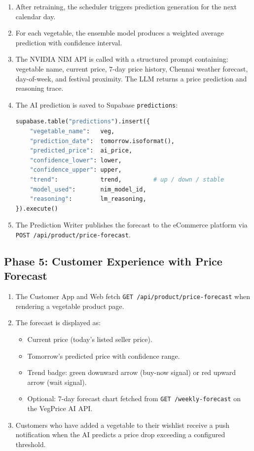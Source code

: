 \documentclass[12pt, a4paper, oneside]{report}
\begin{document}
\begin{enumerate}
  \item After retraining, the scheduler triggers prediction generation for the
        next calendar day.
  \item For each vegetable, the ensemble model produces a weighted average
        prediction with confidence interval.
  \item The NVIDIA NIM API is called with a structured prompt containing:
        vegetable name, current price, 7-day price history, Chennai weather
        forecast, day-of-week, and festival proximity. The LLM returns a
        price prediction and reasoning trace.
  \item The AI prediction is saved to Supabase \texttt{predictions}:
    \begin{lstlisting}[language=Python, numbers=none]
supabase.table("predictions").insert({
    "vegetable_name":   veg,
    "prediction_date":  tomorrow.isoformat(),
    "predicted_price":  ai_price,
    "confidence_lower": lower,
    "confidence_upper": upper,
    "trend":            trend,         # up / down / stable
    "model_used":       nim_model_id,
    "reasoning":        lm_reasoning,
}).execute()
    \end{lstlisting}
  \item The Prediction Writer publishes the forecast to the eCommerce platform
        via \texttt{POST /api/product/price-forecast}.
\end{enumerate}

\subsection{Phase 5: Customer Experience with Price Forecast}

\begin{enumerate}
  \item The Customer App and Web fetch \texttt{GET /api/product/price-forecast}
        when rendering a vegetable product page.
  \item The forecast is displayed as:
    \begin{itemize}
      \item Current price (today's listed seller price).
      \item Tomorrow's predicted price with confidence range.
      \item Trend badge: green downward arrow (buy-now signal) or
            red upward arrow (wait signal).
      \item Optional: 7-day forecast chart fetched from
            \texttt{GET /weekly-forecast} on the VegPrice AI API.
    \end{itemize}
  \item Customers who have added a vegetable to their wishlist receive a
        push notification when the AI predicts a price drop exceeding a
        configured threshold.
\end{enumerate}
\end{document}
